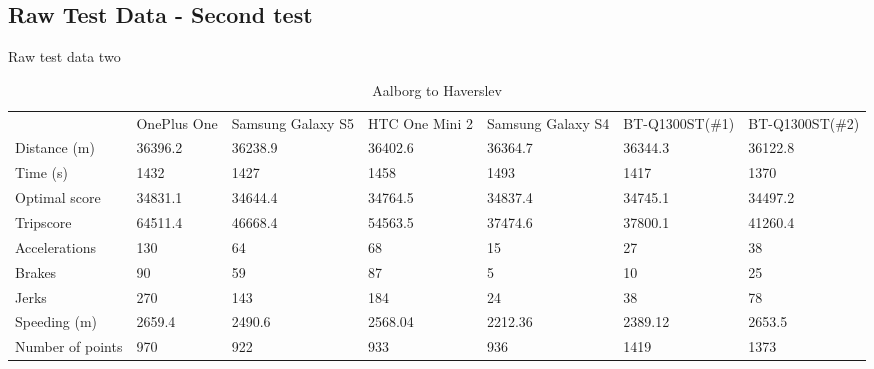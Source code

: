 \subsection*{Raw Test Data - Second test}\label{app:rawtestdata2}
Raw test data two

\begin{table}[]
\centering
\caption{Aalborg to Haverslev}
\label{my-label}
\begin{tabular}{lllllll}
                 & OnePlus One & Samsung Galaxy S5 & HTC One Mini 2 & Samsung Galaxy S4 & BT-Q1300ST(\#1) & BT-Q1300ST(\#2) \\
Distance (m)     & 36396.2     & 36238.9           & 36402.6        & 36364.7           & 36344.3         & 36122.8         \\
Time (s)         & 1432        & 1427              & 1458           & 1493              & 1417            & 1370            \\
Optimal score    & 34831.1     & 34644.4           & 34764.5        & 34837.4           & 34745.1         & 34497.2         \\
Tripscore        & 64511.4     & 46668.4           & 54563.5        & 37474.6           & 37800.1         & 41260.4         \\
Accelerations    & 130         & 64                & 68             & 15                & 27              & 38              \\
Brakes           & 90          & 59                & 87             & 5                 & 10              & 25              \\
Jerks            & 270         & 143               & 184            & 24                & 38              & 78              \\
Speeding (m)     & 2659.4      & 2490.6            & 2568.04        & 2212.36           & 2389.12         & 2653.5          \\
Number of points & 970         & 922               & 933            & 936               & 1419            & 1373           
\end{tabular}
\end{table}

